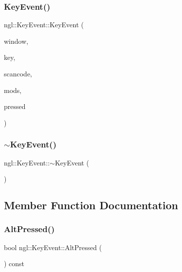 \subsubsection{\texorpdfstring{Key\+Event()}{KeyEvent()}}
{\footnotesize\ttfamily ngl\+::\+Key\+Event\+::\+Key\+Event (\begin{DoxyParamCaption}\item[{G\+L\+F\+Wwindow $\ast$}]{window,  }\item[{const int}]{key,  }\item[{const int}]{scancode,  }\item[{const int}]{mods,  }\item[{const bool}]{pressed }\end{DoxyParamCaption})}

\mbox{\label{structngl_1_1_key_event_a69ed6149a7a1cfd0fa4f904d3b398988}} 
\subsubsection{\texorpdfstring{$\sim$\+Key\+Event()}{~KeyEvent()}}
{\footnotesize\ttfamily ngl\+::\+Key\+Event\+::$\sim$\+Key\+Event (\begin{DoxyParamCaption}{ }\end{DoxyParamCaption})}



\subsection{Member Function Documentation}
\mbox{\label{structngl_1_1_key_event_a38f7dd68a0fa727492d1861c4958418f}} 
\subsubsection{\texorpdfstring{Alt\+Pressed()}{AltPressed()}}
{\footnotesize\ttfamily bool ngl\+::\+Key\+Event\+::\+Alt\+Pressed (\begin{DoxyParamCaption}{ }\end{DoxyParamCaption}) const}

